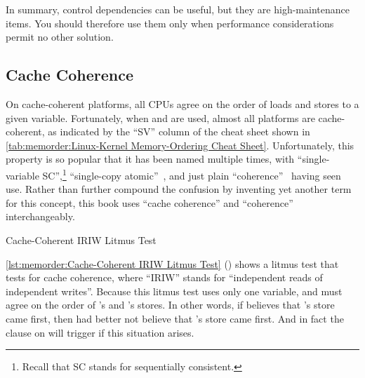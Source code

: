 In summary, control dependencies can be useful, but they are
high-maintenance items.
You should therefore use them only when performance considerations
permit no other solution.

\QuickQuizEnd

\subsection{Cache Coherence}
\label{sec:memorder:Cache Coherence}

On cache-coherent platforms, all CPUs agree on the order of loads and
stores to a given variable.
Fortunately, when  and  are used,
almost all platforms are cache-coherent, as indicated by the ``SV''
column of the cheat sheet shown in
\cref{tab:memorder:Linux-Kernel Memory-Ordering Cheat Sheet}.
Unfortunately, this property is so popular that it has been named
multiple times, with ``single-variable SC'',\footnote{
	Recall that SC stands for sequentially consistent.}
``single-copy atomic''~\cite{Stone:1995:SP:623262.623912},
and just plain ``coherence''~\cite{JadeAlglave2011ppcmem}
having seen use.
Rather than further compound the confusion by inventing yet another term
for this concept, this book uses ``cache coherence'' and ``coherence''
interchangeably.

\begin{listing}

\caption{Cache-Coherent IRIW Litmus Test}
\label{lst:memorder:Cache-Coherent IRIW Litmus Test}
\end{listing}

\begin{fcvref}
\cref{lst:memorder:Cache-Coherent IRIW Litmus Test}
()
shows a litmus test that tests for cache coherence,
where ``IRIW'' stands
for ``independent reads of independent writes''.
Because this litmus test uses only one variable,
 and  must agree
on the order of 's and 's stores.
In other words, if  believes that 's store
came first, then  had better not believe that
's store came first.
And in fact the  clause on  will trigger if this
situation arises.
\end{fcvref}

